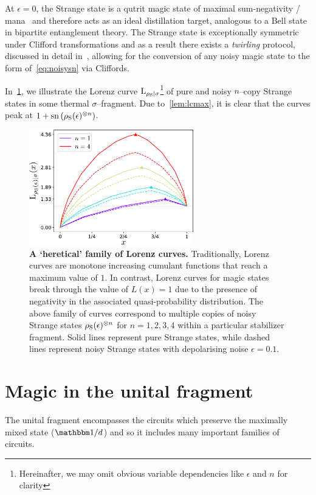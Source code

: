\documentclass[pra,
aps,
twocolumn,
superscriptaddress,
groupedaddress,
nofootinbib,
reprint
]{revtex4-1}
\begin{document}
At $\epsilon=0$, the Strange state is a qutrit magic state of maximal sum-negativity / mana~\cite{cit:veitch2} and therefore acts as an ideal distillation target, analogous to a Bell state in bipartite entanglement theory.
The Strange state is exceptionally symmetric under Clifford transformations and as a result there exists a \emph{twirling} protocol, discussed in detail in~\cite{cit:prakash,cit:prakash2}, allowing for the conversion of any noisy magic state to the form of~\cref{eq:noisysn} via Cliffords.

In~\cref{fig:lcs}, we illustrate the Lorenz curve ${{\rm{L}}_{\rho_{\rm{S}}|\sigma}}$\footnote{Hereinafter, we may omit obvious variable dependencies like $\epsilon$ and $n$ for clarity} of pure and noisy $n$--copy Strange states in some thermal $\sigma$--fragment.
Due to~\cref{lem:lcmax}, it is clear that the curves peak at $1 + {{\rm{sn}}\left(\rho_{\rm{S}}(\epsilon)^{\otimes n}\right)}$.
\begin{figure}
    \centering
    \includegraphics[height=5cm]{figs/lc_strange.pdf}
    \caption{\textbf{A `heretical' family of Lorenz curves.} Traditionally, Lorenz curves are monotone increasing cumulant functions that reach a maximum value of $1$. In contrast, Lorenz curves for magic states break through the value of $L(x)=1$ due to the presence of negativity in the associated quasi-probability distribution. The above family of curves correspond to multiple copies of noisy Strange states $\rho_{\rm{S}}(\epsilon)^{\otimes n}$ for $n=1,2,3,4$ within a particular stabilizer fragment. Solid lines represent pure Strange states, while dashed lines represent noisy Strange states with depolarising noise $\epsilon = 0.1$.
    }
    \label{fig:lcs}
\end{figure}

\section{Magic in the unital fragment}
\label{sec:unital}

The unital fragment encompasses the circuits which preserve the maximally mixed state ($\id/d$) and so it includes many important families of circuits.
\end{document}
